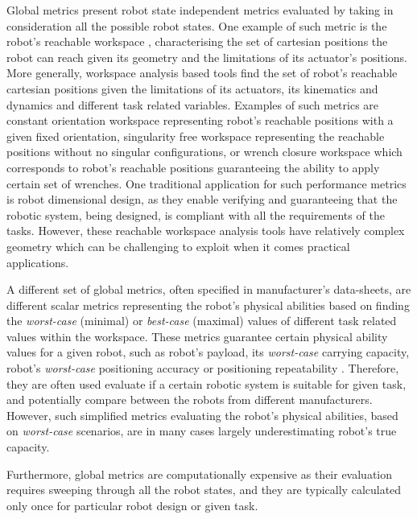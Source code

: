 Global metrics present robot state independent metrics evaluated by taking in consideration all the possible robot states.
One example of such metric is the robot's reachable workspace \cite{Gosselin1991Synthesis,Vahrenkamp2016,kucuk2005robot}, characterising the set of cartesian positions the robot can reach given its geometry and the limitations of its actuator's positions. More generally, workspace analysis based tools find the set of robot's reachable cartesian positions given the limitations of its actuators, its kinematics and dynamics and different task related variables. Examples of such metrics are  constant orientation workspace \cite{Merlet1999Determination} representing robot's reachable positions with a given fixed orientation, singularity free workspace \cite{Jiang2008} representing the reachable positions without no singular configurations, or wrench closure workspace \cite{gouttefarde2006determination,Lau2011} which corresponds to robot's reachable positions guaranteeing the ability to apply certain set of wrenches.
One traditional application for such performance metrics is robot dimensional design, as they enable verifying and guaranteeing that the robotic system, being designed, is compliant with all the requirements of the tasks. 
However, these reachable workspace analysis tools have relatively complex geometry which can be challenging to exploit when it comes practical applications. 

A different set of global metrics, often specified in manufacturer's data-sheets, are different scalar metrics representing the robot's physical abilities based on finding the \textit{worst-case} (minimal) or \textit{best-case} (maximal) values of different task related values within the workspace. These metrics guarantee certain physical ability values for a given robot, such as robot's payload, its \textit{worst-case} carrying capacity, robot's \textit{worst-case} positioning accuracy or positioning repeatability \cite{russo2022measuring}. 
Therefore, they are often used evaluate if a certain robotic system is suitable for given task, and potentially compare between the robots from different manufacturers. However, such simplified metrics evaluating the robot's physical abilities, based on \textit{worst-case} scenarios, are in many cases largely underestimating robot's true capacity.

Furthermore, global metrics are computationally expensive as their evaluation requires sweeping through all the robot states, and they are typically calculated only once for particular robot design or given task.


